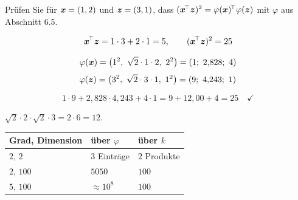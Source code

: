 \begin{aufgabe}
Prüfen Sie für $\boldsymbol{x} = (1,2)$ und $\boldsymbol{z} = (3,1)$, dass $(\boldsymbol{x}^{\!\top}\boldsymbol{z})^{2} = \varphi(\boldsymbol{x})^{\!\top}\varphi(\boldsymbol{z})$ mit $\varphi$ aus Abschnitt 6.5.

\loesung
{}
\[ \boldsymbol{x}^{\!\top}\boldsymbol{z} = 1\cdot3 + 2\cdot1 = 5, \qquad (\boldsymbol{x}^{\!\top}\boldsymbol{z})^{2} = 25 \]

\[ \varphi(\vek x) = \bigl(1^{2},\ \sqrt2\cdot1\cdot2,\ 2^{2}\bigr) = (1;\ 2{,}828;\ 4) \]
\[ \varphi(\vek z) = \bigl(3^{2},\ \sqrt2\cdot3\cdot1,\ 1^{2}\bigr) = (9;\ 4{,}243;\ 1) \]

\[ 1\cdot9 + 2{,}828\cdot4{,}243 + 4\cdot1 = 9 + 12{,}00 + 4 = 25 \quad \checkmark \]

 $\sqrt2\cdot2\cdot\sqrt2\cdot3 = 2\cdot6 = 12$.

\begin{center}
{\small
\renewcommand{\arraystretch}{1.5}
\begin{tabular}{@{}P{3.4cm}P{2.2cm}P{2.2cm}@{}}
\toprule
\textbf{Grad, Dimension} & \textbf{über $\varphi$} & \textbf{über $k$}\\
\midrule
$2$, $2$ & $3$ Einträge & $2$ Produkte\\
$2$, $100$ & $5050$ & $100$\\
$5$, $100$ & $\approx 10^{8}$ & $100$\\
\bottomrule
\end{tabular}}
\end{center}

\begin{center}
\begin{minipage}{0.88\textwidth}
\end{minipage}
\end{center}
\end{aufgabe}

